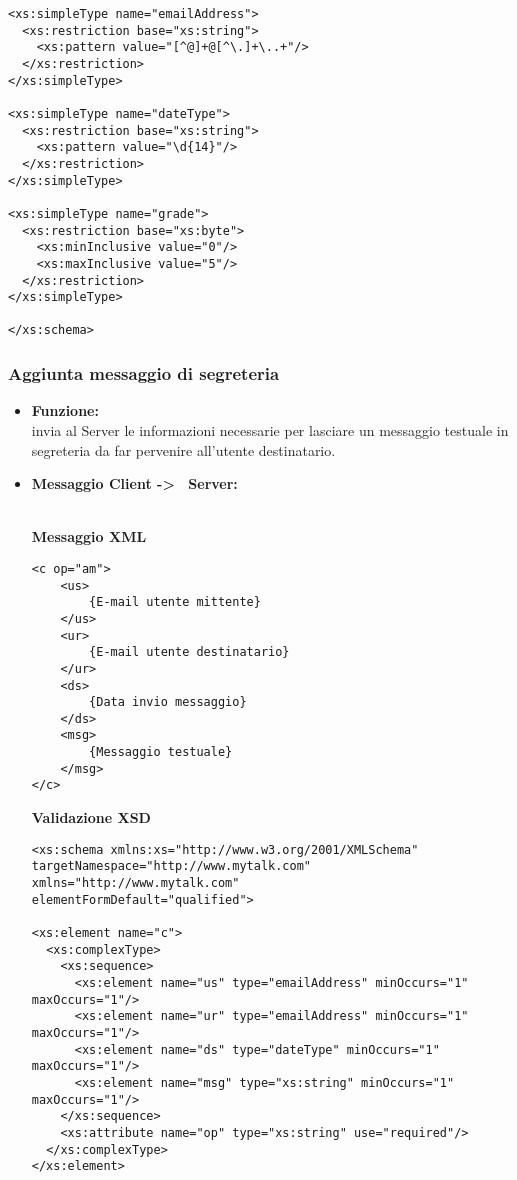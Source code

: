 {{\begin{itemize}
{\begin{lstlisting}
<xs:simpleType name="emailAddress"> 
  <xs:restriction base="xs:string"> 
    <xs:pattern value="[^@]+@[^\.]+\..+"/> 
  </xs:restriction> 
</xs:simpleType>

<xs:simpleType name="dateType">
  <xs:restriction base="xs:string">
    <xs:pattern value="\d{14}"/>
  </xs:restriction>
</xs:simpleType>

<xs:simpleType name="grade">
  <xs:restriction base="xs:byte">
    <xs:minInclusive value="0"/>
    <xs:maxInclusive value="5"/>
  </xs:restriction>
</xs:simpleType>

</xs:schema>
				\end{lstlisting}
				}
		\end{itemize}
	}%
	
	\subsubsection{Aggiunta messaggio di segreteria}{
	\label{opAM}
		\begin{itemize}
			\item[] \textbf{Funzione:}{\\
				invia al Server le informazioni necessarie per lasciare un messaggio testuale in segreteria da far pervenire all'utente destinatario.
				}
			
			\item[] \textbf{Messaggio Client -\textgreater~ Server:}{\\
			\textbf{Messaggio XML}\\
				\begin{lstlisting}
<c op="am">
	<us>
		{E-mail utente mittente}	
	</us>
	<ur>
		{E-mail utente destinatario}
	</ur>
	<ds>
		{Data invio messaggio}
	</ds>
	<msg>
		{Messaggio testuale}
	</msg>
</c>
				\end{lstlisting}
				\textbf{Validazione XSD}\\
				\begin{lstlisting}
<xs:schema xmlns:xs="http://www.w3.org/2001/XMLSchema"
targetNamespace="http://www.mytalk.com"
xmlns="http://www.mytalk.com"
elementFormDefault="qualified">

<xs:element name="c">
  <xs:complexType>
    <xs:sequence>
      <xs:element name="us" type="emailAddress" minOccurs="1" maxOccurs="1"/>
      <xs:element name="ur" type="emailAddress" minOccurs="1" maxOccurs="1"/>
      <xs:element name="ds" type="dateType" minOccurs="1" maxOccurs="1"/>
      <xs:element name="msg" type="xs:string" minOccurs="1" maxOccurs="1"/>
    </xs:sequence>
    <xs:attribute name="op" type="xs:string" use="required"/>
  </xs:complexType>
</xs:element>


\end{lstlisting}}
\end{itemize}}}
